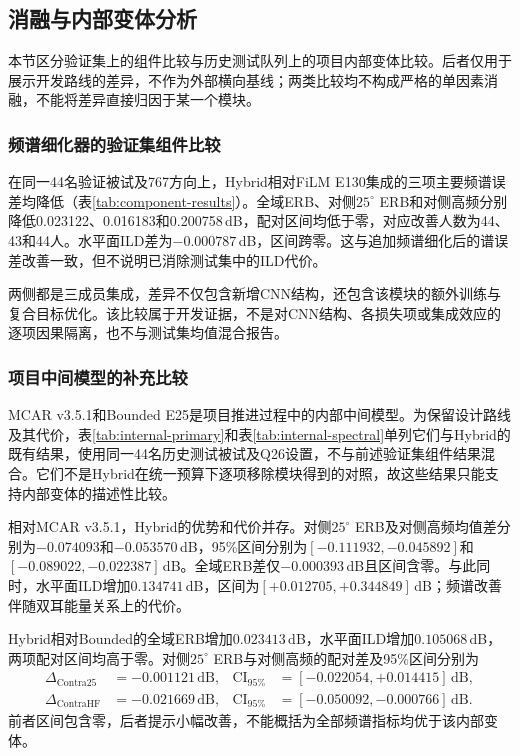 \FloatBarrier
\subsection{消融与内部变体分析}
\label{sec:ablation}
本节区分验证集上的组件比较与历史测试队列上的项目内部变体比较。后者仅用于展示开发路线的差异，不作为外部横向基线；两类比较均不构成严格的单因素消融，不能将差异直接归因于某一个模块。

\subsubsection{频谱细化器的验证集组件比较}
在同一44名验证被试及767方向上，Hybrid相对FiLM E130集成的三项主要频谱误差均降低（表\ref{tab:component-results}）。全域ERB、对侧$25^\circ$ ERB和对侧高频分别降低0.023122、0.016183和0.200758\,dB，配对区间均低于零，对应改善人数为44、43和44人。水平面ILD差为$-0.000787$\,dB，区间跨零。这与追加频谱细化后的谱误差改善一致，但不说明已消除测试集中的ILD代价。



两侧都是三成员集成，差异不仅包含新增CNN结构，还包含该模块的额外训练与复合目标优化。该比较属于开发证据，不是对CNN结构、各损失项或集成效应的逐项因果隔离，也不与测试集均值混合报告。

\subsubsection{项目中间模型的补充比较}
MCAR v3.5.1和Bounded E25是项目推进过程中的内部中间模型。为保留设计路线及其代价，表\ref{tab:internal-primary}和表\ref{tab:internal-spectral}单列它们与Hybrid的既有结果，使用同一44名历史测试被试及Q26设置，不与前述验证集组件结果混合。它们不是Hybrid在统一预算下逐项移除模块得到的对照，故这些结果只能支持内部变体的描述性比较。




相对MCAR v3.5.1，Hybrid的优势和代价并存。对侧$25^\circ$ ERB及对侧高频均值差分别为$-0.074093$和$-0.053570$\,dB，95\%区间分别为$[-0.111932,-0.045892]$和$[-0.089022,-0.022387]$\,dB。全域ERB差仅$-0.000393$\,dB且区间含零。与此同时，水平面ILD增加$0.134741$\,dB，区间为$[+0.012705,+0.344849]$\,dB；频谱改善伴随双耳能量关系上的代价。

Hybrid相对Bounded的全域ERB增加$0.023413$\,dB，水平面ILD增加$0.105068$\,dB，两项配对区间均高于零。对侧$25^\circ$ ERB与对侧高频的配对差及95\%区间分别为
\[
\begin{aligned}
\Delta_{\mathrm{Contra25}}&=-0.001121\,\mathrm{dB},&
\mathrm{CI}_{95\%}&=[-0.022054,+0.014415]\,\mathrm{dB},\\
\Delta_{\mathrm{ContraHF}}&=-0.021669\,\mathrm{dB},&
\mathrm{CI}_{95\%}&=[-0.050092,-0.000766]\,\mathrm{dB}.
\end{aligned}
\]
前者区间包含零，后者提示小幅改善，不能概括为全部频谱指标均优于该内部变体。

